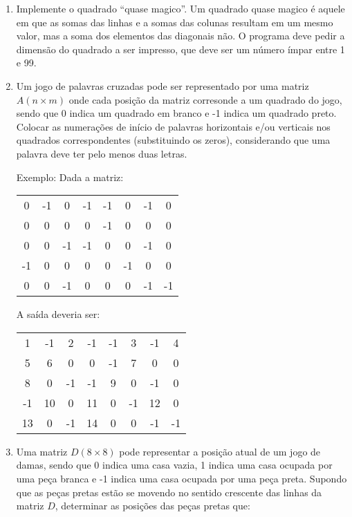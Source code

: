 \begin{enumerate}
\item Implemente o quadrado ``quase magico''.  
Um quadrado quase magico é aquele em que as somas das linhas e a somas das
colunas resultam em um mesmo valor, mas a soma dos elementos das 
diagonais não.  O programa deve pedir a dimensão do
quadrado a ser impresso, que deve ser um número ímpar entre 1 e 99.



\item Um jogo  de palavras cruzadas pode ser representado  por uma matriz $A
(n \times  m)$ onde cada posição da  matriz corresonde a um  quadrado do jogo,
sendo  que 0  indica  um quadrado  em  branco e  -1  indica um  quadrado
preto.  Colocar as  numerações de  início de  palavras  horizontais e/ou
verticais  nos   quadrados  correspondentes  (substituindo   os  zeros),
considerando que uma palavra deve ter pelo menos duas letras. 

Exemplo: Dada a matriz:
\begin{center}
\begin{tabular}{cccccccc}
 0 & -1 &  0 & -1 & -1 &  0 & -1 &  0 \\
 0 &  0 &  0 &  0 & -1 &  0 &  0 &  0 \\
 0 &  0 & -1 & -1 &  0 &  0 & -1 &  0\\
-1 &  0 &  0 &  0 &  0 & -1 &  0 &  0\\
 0 &  0 & -1 &  0 &  0 &  0 & -1 & -1\\
\end{tabular}
\end{center}

A saída deveria ser:
\begin{center}
\begin{tabular}{cccccccc}
 1 & -1 &  2 & -1 & -1 &  3 & -1 &  4 \\
 5 &  6 &  0 &  0 & -1 &  7 &  0 &  0 \\
 8 &  0 & -1 & -1 &  9 &  0 & -1 &  0\\
-1 & 10 &  0 & 11 &  0 & -1 & 12 &  0\\
13 &  0 & -1 & 14 &  0 &  0 & -1 & -1\\
\end{tabular}
\end{center}

\item Uma matriz $D (8 \times 8)$ 
pode representar a posição atual de um jogo de damas, 
sendo que 0 indica uma casa vazia, 1 indica uma casa ocupada por uma peça branca
e -1 indica uma casa ocupada por uma peça preta. Supondo que as peças pretas
estão se movendo no sentido crescente das linhas da matriz $D$, determinar
as posições das peças pretas que:


\end{enumerate}
